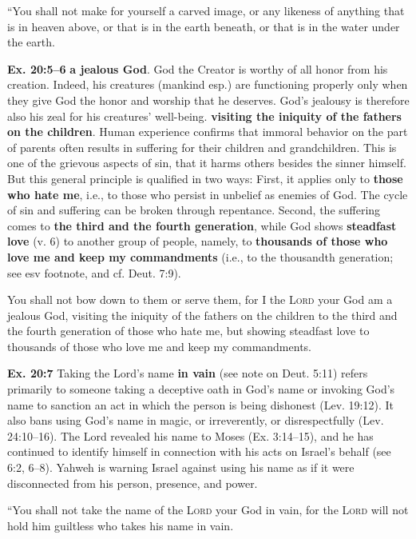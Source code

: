 \documentclass{bible-study-handout}
\begin{document}
“You shall not make for yourself a carved image, or any likeness of anything that is in heaven above, or that is in the earth beneath, or that is in the water under the earth.

\begin{studycommentinline}\textbf{Ex. 20:5–6} \textbf{a jealous God}. God the Creator is worthy of all honor from his creation. Indeed, his creatures (mankind esp.) are functioning properly only when they give God the honor and worship that he deserves. God’s jealousy is therefore also his zeal for his creatures’ well-being. \textbf{visiting the iniquity of the fathers on the children}. Human experience confirms that immoral behavior on the part of parents often results in suffering for their children and grandchildren. This is one of the grievous aspects of sin, that it harms others besides the sinner himself. But this general principle is qualified in two ways: First, it applies only to \textbf{those who hate me}, i.e., to those who persist in unbelief as enemies of God. The cycle of sin and suffering can be broken through repentance. Second, the suffering comes to \textbf{the third and the fourth generation}, while God shows \textbf{steadfast love} (v. 6) to another group of people, namely, to \textbf{thousands of those who love me and keep my commandments} (i.e., to the thousandth generation; see esv footnote, and cf. Deut. 7:9).\end{studycommentinline}

\noindent{}You shall not bow down to them or serve them, for I the \textsc{Lord} your God am a jealous God, visiting the iniquity of the fathers on the children to the third and the fourth generation of those who hate me, but showing steadfast love to thousands of those who love me and keep my commandments.

\begin{studycomment}\textbf{Ex. 20:7} Taking the Lord’s name \textbf{in vain} (see note on Deut. 5:11) refers primarily to someone taking a deceptive oath in God’s name or invoking God’s name to sanction an act in which the person is being dishonest (Lev. 19:12). It also bans using God’s name in magic, or irreverently, or disrespectfully (Lev. 24:10–16). The Lord revealed his name to Moses (Ex. 3:14–15), and he has continued to identify himself in connection with his acts on Israel’s behalf (see 6:2, 6–8). Yahweh is warning Israel against using his name as if it were disconnected from his person, presence, and power.\end{studycomment}“You shall not take the name of the \textsc{Lord} your God in vain, for the \textsc{Lord} will not hold him guiltless who takes his name in vain.
\end{document}
